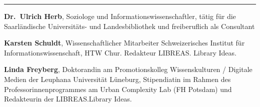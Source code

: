 \begin{center}\rule{0.5\linewidth}{\linethickness}\end{center}

\textbf{Dr.~Ulrich Herb}, Soziologe und Informationswissenschaftler,
tätig für die Saarländische Universitäts- und Landesbibliothek und
freiberuflich als Consultant

\textbf{Karsten Schuldt}, Wissenschaftlicher Mitarbeiter Schweizerisches
Institut für Informationswissenschaft, HTW Chur. Redakteur LIBREAS.
Library Ideas.

\textbf{Linda Freyberg}, Doktorandin am Promotionskolleg Wissenskulturen
/ Digitale Medien der Leuphana Universität Lüneburg, Stipendiatin im
Rahmen des Professorinnenprogrammes am Urban Complexity Lab (FH Potsdam)
und Redakteurin der LIBREAS.Library Ideas.

